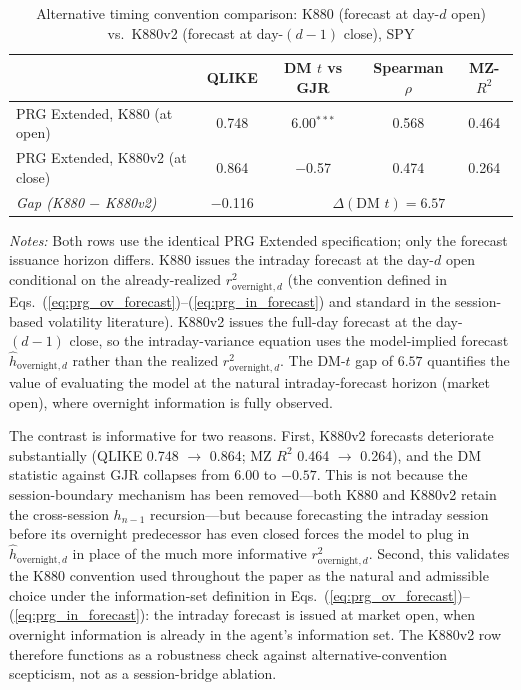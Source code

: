 \documentclass[11pt,a4paper]{article}
\begin{document}
\begin{table}[htbp]
\centering
\caption{Alternative timing convention comparison: K880 (forecast at day-$d$ open) vs.\ K880v2 (forecast at day-$(d-1)$ close), SPY}
\label{tab:ablation}
\small
\begin{tabular}{lcccc}
\toprule
 & QLIKE & DM $t$ vs GJR & Spearman $\rho$ & MZ-$R^2$ \\
\midrule
PRG Extended, K880 (at open)   & 0.748 & 6.00$^{***}$ & 0.568 & 0.464 \\
PRG Extended, K880v2 (at close) & 0.864 & $-$0.57      & 0.474 & 0.264 \\[2pt]
\emph{Gap (K880 $-$ K880v2)} & $-$0.116 & \multicolumn{3}{c}{$\Delta(\text{DM } t) = 6.57$} \\
\bottomrule
\end{tabular}
\begin{flushleft}
\footnotesize
\emph{Notes:} Both rows use the identical PRG Extended specification; only the forecast issuance horizon differs. K880 issues the intraday forecast at the day-$d$ open conditional on the already-realized $r^2_{\text{overnight},d}$ (the convention defined in Eqs.~(\ref{eq:prg_ov_forecast})--(\ref{eq:prg_in_forecast}) and standard in the session-based volatility literature). K880v2 issues the full-day forecast at the day-$(d-1)$ close, so the intraday-variance equation uses the model-implied forecast $\hat h_{\text{overnight},d}$ rather than the realized $r^2_{\text{overnight},d}$. The DM-$t$ gap of $6.57$ quantifies the value of evaluating the model at the natural intraday-forecast horizon (market open), where overnight information is fully observed.
\end{flushleft}
\end{table}

The contrast is informative for two reasons. First, K880v2 forecasts deteriorate substantially (QLIKE 0.748 $\to$ 0.864; MZ $R^2$ 0.464 $\to$ 0.264), and the DM statistic against GJR collapses from $6.00$ to $-0.57$. This is not because the session-boundary mechanism has been removed---both K880 and K880v2 retain the cross-session $h_{n-1}$ recursion---but because forecasting the intraday session before its overnight predecessor has even closed forces the model to plug in $\hat h_{\text{overnight},d}$ in place of the much more informative $r^2_{\text{overnight},d}$. Second, this validates the K880 convention used throughout the paper as the natural and admissible choice under the information-set definition in Eqs.~(\ref{eq:prg_ov_forecast})--(\ref{eq:prg_in_forecast}): the intraday forecast is issued at market open, when overnight information is already in the agent's information set. The K880v2 row therefore functions as a robustness check against alternative-convention scepticism, not as a session-bridge ablation.
\end{document}
